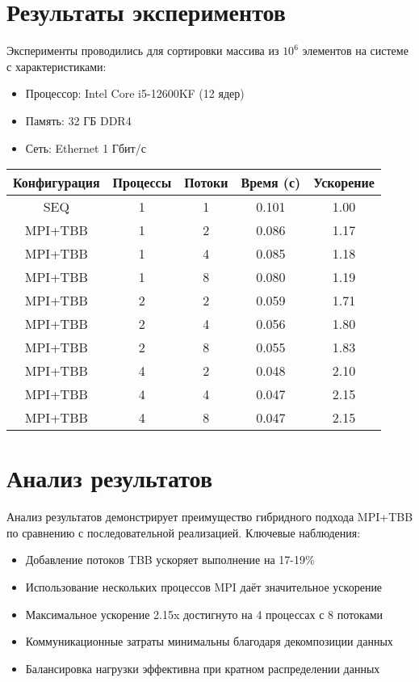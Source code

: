 \documentclass[a4paper,12pt]{article}
\begin{document}
\section*{Результаты экспериментов}
Эксперименты проводились для сортировки массива из $10^6$ элементов на системе с характеристиками:
\begin{itemize}
    \item Процессор: Intel Core i5-12600KF (12 ядер)
    \item Память: 32 ГБ DDR4
    \item Сеть: Ethernet 1 Гбит/с
\end{itemize}

\begin{center}
\begin{tabular}{|c|c|c|c|c|}
\hline
\textbf{Конфигурация} & \textbf{Процессы} & \textbf{Потоки} & \textbf{Время (с)} & \textbf{Ускорение} \\
\hline
SEQ & 1 & 1 & 0.101 & 1.00 \\
\hline
MPI+TBB & 1 & 2 & 0.086 & 1.17 \\
MPI+TBB & 1 & 4 & 0.085 & 1.18 \\
MPI+TBB & 1 & 8 & 0.080 & 1.19 \\
\hline
MPI+TBB & 2 & 2 & 0.059 & 1.71 \\
MPI+TBB & 2 & 4 & 0.056 & 1.80 \\
MPI+TBB & 2 & 8 & 0.055 & 1.83 \\
\hline
MPI+TBB & 4 & 2 & 0.048 & 2.10 \\
MPI+TBB & 4 & 4 & 0.047 & 2.15 \\
MPI+TBB & 4 & 8 & 0.047 & 2.15 \\
\hline
\end{tabular}
\end{center}

\section*{Анализ результатов}
Анализ результатов демонстрирует преимущество гибридного подхода MPI+TBB по сравнению с последовательной реализацией. Ключевые наблюдения:

\begin{itemize}
    \item Добавление потоков TBB ускоряет выполнение на 17-19\%
    \item Использование нескольких процессов MPI даёт значительное ускорение
    \item Максимальное ускорение 2.15x достигнуто на 4 процессах с 8 потоками
    \item Коммуникационные затраты минимальны благодаря декомпозиции данных
    \item Балансировка нагрузки эффективна при кратном распределении данных
\end{itemize}
\end{document}
